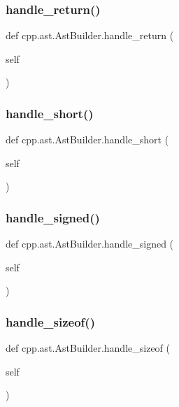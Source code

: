\subsubsection{\texorpdfstring{handle\_return()}{handle\_return()}}
{\footnotesize\ttfamily def cpp.\+ast.\+Ast\+Builder.\+handle\+\_\+return (\begin{DoxyParamCaption}\item[{}]{self }\end{DoxyParamCaption})}

\mbox{\label{classcpp_1_1ast_1_1AstBuilder_adf11f377386bdb44fe1094ff8adf9142}} 
\subsubsection{\texorpdfstring{handle\_short()}{handle\_short()}}
{\footnotesize\ttfamily def cpp.\+ast.\+Ast\+Builder.\+handle\+\_\+short (\begin{DoxyParamCaption}\item[{}]{self }\end{DoxyParamCaption})}

\mbox{\label{classcpp_1_1ast_1_1AstBuilder_a61c1e82b2b4fdc337cf360e485851390}} 
\subsubsection{\texorpdfstring{handle\_signed()}{handle\_signed()}}
{\footnotesize\ttfamily def cpp.\+ast.\+Ast\+Builder.\+handle\+\_\+signed (\begin{DoxyParamCaption}\item[{}]{self }\end{DoxyParamCaption})}

\mbox{\label{classcpp_1_1ast_1_1AstBuilder_acfd733ff9115e3292bea10e160bb6184}} 
\subsubsection{\texorpdfstring{handle\_sizeof()}{handle\_sizeof()}}
{\footnotesize\ttfamily def cpp.\+ast.\+Ast\+Builder.\+handle\+\_\+sizeof (\begin{DoxyParamCaption}\item[{}]{self }\end{DoxyParamCaption})}

